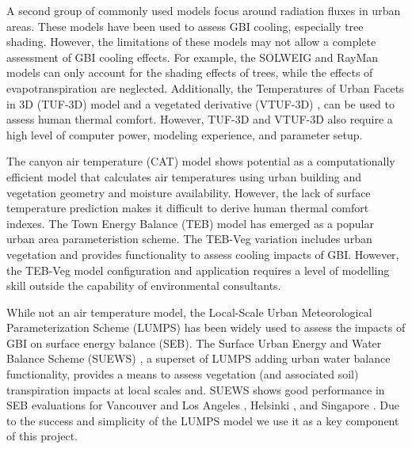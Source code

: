 \documentclass[journal abbreviation, manuscript]{copernicus}
\begin{document}
A second group of commonly used models focus around radiation fluxes in urban areas. These models have been used to assess GBI cooling, especially tree shading. However, the limitations of these models may not allow a complete assessment of GBI cooling effects. For example, the SOLWEIG \citep{Lindberg2008a} and RayMan \citep{Matzarakis2007,Matzarakis2010} models can only account for the shading effects of trees, while the effects of evapotranspiration are neglected. Additionally, the Temperatures of Urban Facets in 3D (TUF-3D) model \citep{Krayenhoff2007b} and a vegetated derivative (VTUF-3D) \citep{nice2018}, can be used to assess human thermal comfort. However, TUF-3D and VTUF-3D also require a high level of computer power, modeling experience, and parameter setup.  

The canyon air temperature (CAT) model \citep{Erell2006} shows potential as a computationally efficient model that calculates air temperatures using urban building and vegetation geometry and moisture availability. However, the lack of surface temperature prediction makes it difficult to derive human thermal comfort indexes. The Town Energy Balance (TEB) model \citep{Masson2000} has emerged as a popular urban area parameteristion scheme. The TEB-Veg \citep{Lemonsu2012,redon2017} variation includes  urban vegetation and provides functionality to assess cooling impacts of GBI. However, the TEB-Veg model configuration and application requires a  level of modelling skill outside the capability of environmental  consultants. 

While not an air temperature model, the Local-Scale Urban Meteorological Parameterization Scheme (LUMPS) \citep{Grimmond2002a} has been widely used  to assess the impacts of GBI on surface energy balance (SEB). The Surface Urban Energy and Water Balance Scheme (SUEWS) \citep{Jarvi2011}, a superset of LUMPS adding urban water balance functionality, provides a means to assess vegetation (and associated soil) transpiration impacts at local scales and. SUEWS shows good performance in SEB evaluations for Vancouver and Los Angeles \citep{Jarvi2011}, Helsinki \citep{Jarvi2014a}, and Singapore \citep{demuzere2017impact}. Due to the success and simplicity of the LUMPS model we use it as a key component of this project.  
\end{document}
